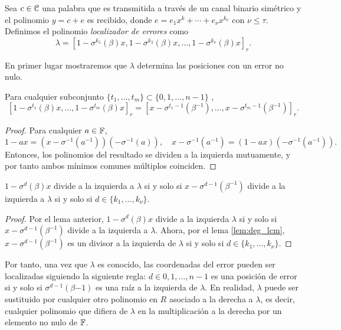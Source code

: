 Sea \(c \in \mathcal{C}\) una palabra que es transmitida a través de un canal binario simétrico y el polinomio \(y = c + e\) es recibido, donde \(e = e_1 x^k + \cdots + e_\nu x^{k_\nu}\) con \(\nu \leq \tau\). Definimos el polinomio \textit{localizador de errores} como
\[
\lambda = {\left[1 - \sigma^{k_1}(\beta)x, 1 - \sigma^{k_2}(\beta)x, \dots, 1 - \sigma^{k_\nu}(\beta)x\right]}_r
.\]

En primer lugar mostraremos que \(\lambda\) determina las posiciones con un error no nulo.

\begin{lemma}\label{lem:lambda_roots}
    Para cualquier subconjunto \(\{t_1, \dots, t_m\} \subset \{0, 1, \dots, n-1\}\) ,
    \[
    {\left[1 -\sigma^{t_1}(\beta)x, \dots, 1 - \sigma^{t_m}(\beta)x \right]}_r
    = {\left[x - \sigma^{t_1 - 1}(\beta^{-1}), \dots, x - \sigma^{t_m -1}(\beta^{-1})\right]}_r
    .\]
\end{lemma}

\begin{proof}
    Para cualquier \(a \in \mathbb{F}\),
    \[
    1 - ax = (x - \sigma^{-1}(a^{-1}))(- \sigma^{-1}(a)),\quad
    x - \sigma^{-1}(a^{-1}) = (1 - ax)(-\sigma^{-1}(a^{-1})).
    \]
    Entonces, los polinomios del resultado se dividen a la izquierda mutuamente, y por tanto ambos mínimos comunes múltiplos coinciden.
\end{proof}

\begin{proposition}
\label{prop:root_error_position}
    \(1- \sigma^d(\beta)x\) divide a la izquierda a \(\lambda\) si y solo si \(x - \sigma^{d-1}(\beta^{-1})\) divide a la izquierda a  \(\lambda\) si y solo si \(d \in \{k_1, \dots, k_\nu\}\).
\end{proposition}

\begin{proof}
    Por el lema anterior, \(1 - \sigma^d(\beta)x\) divide a la izquierda \(\lambda\) si y solo si  \(x - \sigma^{d-1}(\beta^{-1})\) divide a la izquierda a \(\lambda\). Ahora, por el lema \ref{lem:deg_lcm}, \(x - \sigma^{d-1}(\beta^{-1})\) es un divisor a la izquierda de \(\lambda\) si y solo si  \(d \in \{k_1, \dots, k_\nu\}\).
\end{proof}

Por tanto, una vez que \(\lambda\) es conocido, las coordenadas del error pueden ser localizadas siguiendo la siguiente regla: \(d \in {0,1, \dots, n-1}\) es una posición de error si y solo si \(\sigma^{d-1}(\beta{-1})\) es una raíz a la izquierda de \(\lambda\). En realidad,  \(\lambda\) puede ser sustituido por cualquier otro polinomio en \(R\) asociado a la derecha a \(\lambda\), es decir, cualquier polinomio que difiera de \(\lambda\) en la multiplicación a la derecha por un elemento no nulo de \(\mathbb{F}\).

